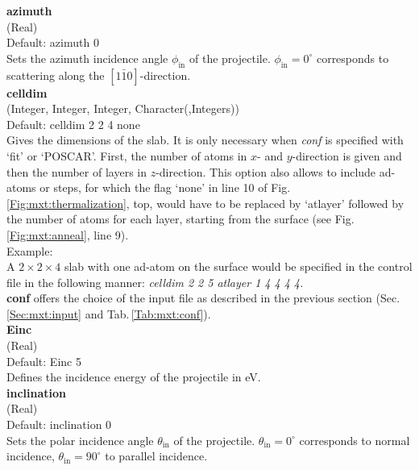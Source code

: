 \documentclass[twoside, 11pt, titlepage, captions=nooneline, a4paper, headsepline]{scrbook}%
\begin{document}
\noindent\textbf{azimuth}\\ 
(Real)\\
Default: azimuth 0\\
Sets the azimuth incidence angle $\phi_\mathrm{in}$ of the projectile. $\phi_\mathrm{in}=0^\circ$ corresponds to scattering along the $[1\bar{1}0]$-direction.\\

\noindent\textbf{celldim}\\ 
(Integer, Integer, Integer, Character(,Integers))\\
Default: celldim 2 2 4 none\\
Gives the dimensions of the slab. It is only necessary when \textit{conf} is specified with `fit' or `POSCAR'. First, the number of atoms in $x$- and $y$-direction is given and then the number of layers in $z$-direction. This option also allows to include ad-atoms or steps, for which the flag `none' in line 10 of Fig.\,\ref{Fig:mxt:thermalization}, top, would have to be replaced by `atlayer' followed by the number of atoms for each layer, starting from the surface (see Fig.\,\ref{Fig:mxt:anneal}, line 9).\\
Example:\\
A $2\times2\times4$ slab with one ad-atom on the surface would be specified in the control file in the following manner: \textit{celldim 2 2 5 atlayer 1 4 4 4 4.}\\


\noindent\textbf{conf} offers the choice of the input file as described in the previous section (Sec.\,\ref{Sec:mxt:input} and Tab.\,\ref{Tab:mxt:conf}).\\

\noindent\textbf{Einc}\\ 
(Real)\\ 
Default: Einc 5\\
Defines the incidence energy of the projectile in eV.\\

\noindent\textbf{inclination}\\ 
(Real)\\ 
Default: inclination 0\\
Sets the polar incidence angle $\theta_\mathrm{in}$ of the projectile. $\theta_\mathrm{in}=0^\circ$ corresponds to normal incidence, $\theta_\mathrm{in}=90^\circ$ to parallel incidence.\\
\end{document}
